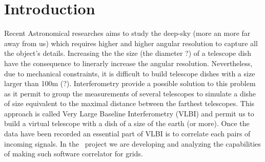 \section{Introduction}

Recent Astronomical researches aims to study the deep-sky (more an more 
far away from us) which requires higher and higher angular resolution to 
capture all the object's details. Increasing the the size (the diameter ?) 
of a telescope dish have the consequence to linerarly increase the angular 
resolution. Nevertheless, due to mechanical constraints, it is difficult to 
build telescope dishes with a size larger than 100m (?). Interferometry provide a 
possible solution to this problem as it permit to group 
the measurements of several telescopes to simulate a dishe of size equivalent to the 
maximal distance between the farthest telescopes. This approach is called Very Large 
Baseline Interferometry (VLBI) and permit us to build a virtual telescope with 
a dish of a size of the earth (or more). Once the data have been recorded an 
essential part of VLBI is to correlate each pairs of incoming signals. 
In the \scarie\ project we are developing and analyzing the 
capabilities of making such software correlator for grids. 

